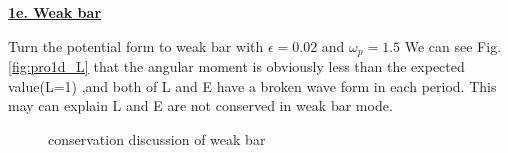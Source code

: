 \documentclass{article}
\begin{document}
\underline{\textbf{1e. Weak bar}}

Turn the potential form to weak bar with $\epsilon=0.02$ and $\omega_p=1.5$
We can see Fig.\ref{fig:pro1d_L} that the angular moment is obviously less than the expected value(L=1) ,and both of L and E have a broken wave form in each period. This may can explain L and E are not conserved in weak bar mode. \\
\begin{figure}[h]
    \centering
    \caption{conservation discussion of weak bar}
    \label{fig:pro1e}
\end{figure}
\end{document}
